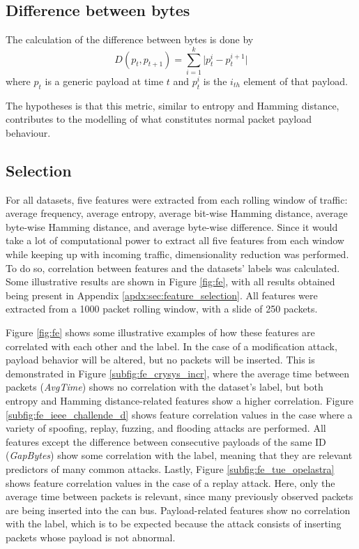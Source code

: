 \subsection{Difference between bytes}

The calculation of the difference between bytes is done by \[D(p_t, p_{t+1}) = \sum_{i = 1}^{k} \vert p_t^i - p_t^{i+1} \vert \] where $p_t$ is a generic payload at time $t$ and $p_t^i$ is the $i_{th}$ element of that payload.\par
The hypotheses is that this metric, similar to entropy and Hamming distance, contributes to the modelling of what constitutes normal packet payload behaviour.

\subsection{Selection}

For all datasets, five features were extracted from each rolling window of traffic: average frequency, average entropy, average bit-wise Hamming distance, average byte-wise Hamming distance, and average byte-wise difference. Since it would take a lot of computational power to extract all five features from each window while keeping up with incoming traffic, dimensionality reduction was performed. To do so, correlation between features and the datasets' labels was calculated. Some illustrative results are shown in Figure \ref{fig:fe}, with all results obtained being present in Appendix \ref{apdx:sec:feature_selection}. All features were extracted from a 1000 packet rolling window, with a slide of 250 packets.\par

Figure \ref{fig:fe} shows some illustrative examples of how these features are correlated with each other and the label. In the case of a modification attack, payload behavior will be altered, but no packets will be inserted. This is demonstrated in Figure \ref{subfig:fe_crysys_incr}, where the average time between packets (\emph{AvgTime}) shows no correlation with the dataset's label, but both entropy and Hamming distance-related features show a higher correlation. Figure \ref{subfig:fe_ieee_challende_d} shows feature correlation values in the case where a variety of spoofing, replay, fuzzing, and flooding attacks are performed. All features except the difference between consecutive payloads of the same ID (\emph{GapBytes}) show some correlation with the label, meaning that they are relevant predictors of many common attacks. Lastly, Figure \ref{subfig:fe_tue_opelastra} shows feature correlation values in the case of a replay attack. Here, only the average time between packets is relevant, since many previously observed packets are being inserted into the \gls*{can} bus. Payload-related features show no correlation with the label, which is to be expected because the attack consists of inserting packets whose payload is not abnormal.

